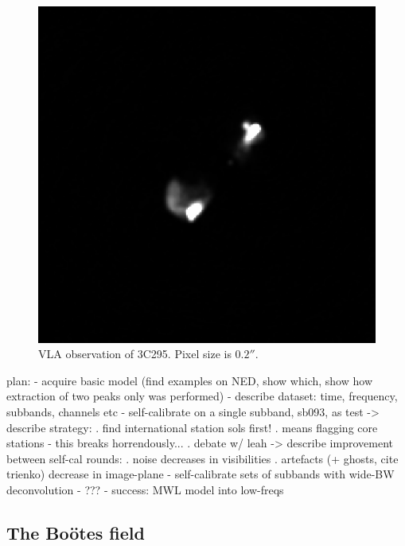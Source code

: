 \begin{figure}[h!]\label{fig.vla.3c295}
\includegraphics[width=\linewidth]{images/3c295-vla}
\caption{VLA observation of 3C295. Pixel size is $0.2''$.}
\end{figure}




\newpage

plan:
 - acquire basic model (find examples on NED, show which, show how extraction of two peaks only was performed)
 - describe dataset: time, frequency, subbands, channels etc
 - self-calibrate on a single subband, sb093, as test
   -> describe strategy:
     . find international station sols first!
     . means flagging core stations - this breaks horrendously...
     . debate w/ leah
   -> describe improvement between self-cal rounds:
     . noise decreases in visibilities
     . artefacts (+ ghosts, cite trienko) decrease in image-plane
 - self-calibrate sets of subbands with wide-BW deconvolution
 - ???
 - success: MWL model into low-freqs






\newpage
\subsection{The Boötes field}\label{subsection.EGS}

